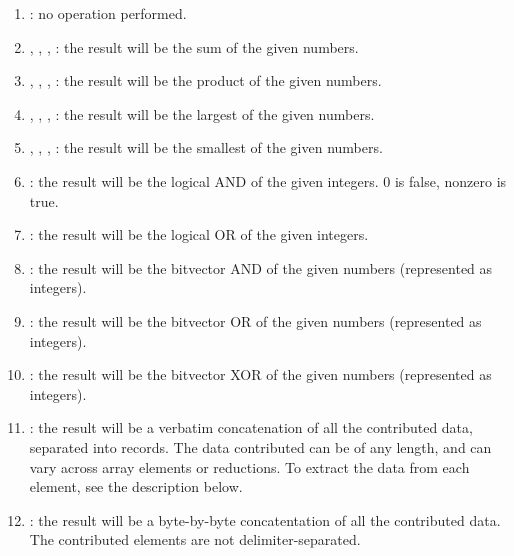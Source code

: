 \begin{enumerate}

\item {} : no operation performed.

\item {}, , ,  : the
result will be the sum of the given numbers.

\item {}, , ,
 : the result will be the product of the given numbers.

\item {}, , ,  : the
result will be the largest of the given numbers.

\item {}, , ,  : the
result will be the smallest of the given numbers.

\item {} : the result will be the logical AND of the given
integers.  0 is false, nonzero is true.

\item {} : the result will be the logical OR of the given
integers.

\item {} : the result will be the bitvector AND of the given numbers (represented as integers).

\item {} : the result will be the bitvector OR of the given numbers (represented as integers).

\item {} : the result will be the bitvector XOR of the given numbers (represented as integers).

\item {} : the result will be a verbatim concatenation of
all the contributed data, separated into  records.
The data contributed can be of any length, and can vary across array elements
or reductions.  To extract the data from each element, see the description
below.

\item {} : the result will be a byte-by-byte
concatentation of all the contributed data.  The contributed elements
are not delimiter-separated. 

\end{enumerate}

